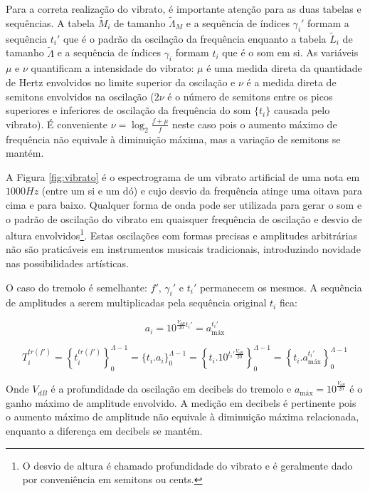 Para a correta realização do vibrato, é importante atenção para as duas tabelas e sequências.
A tabela $\widetilde{M}_i$ de tamanho $\widetilde{\Lambda}_M$ e a sequência de índices $\gamma_i'$ formam a sequência $t_i'$
 que é o padrão da oscilação da frequência enquanto
a tabela $\widetilde{L}_i$ de tamanho $\widetilde{\Lambda}$ e a sequência de índices $\gamma_i$ formam $t_i$ que é o som em si.
As variáveis $\mu$ e $\nu$ quantificam a intensidade do vibrato: $\mu$ é uma medida direta da quantidade
de Hertz envolvidos no limite superior da oscilação e $\nu$ é a medida direta de semitons envolvidos na oscilação ($2\nu$ é o número de semitons entre os picos superiores e inferiores de oscilação da frequência do som $\{t_i\}$ causada pelo vibrato).
É conveniente $\nu=\log_{2}\frac{f+\mu}{f} $ neste caso pois o aumento máximo de frequência
não equivale à diminuição máxima, mas a variação de semitons se mantém.

A Figura \ref{fig:vibrato} é o espectrograma de um vibrato artificial de uma nota em
$1000Hz$ (entre um si e um dó) e cujo desvio da frequência atinge uma oitava
para cima e para baixo. Qualquer forma de onda pode
ser utilizada para gerar o som e o padrão de oscilação do vibrato
em quaisquer frequência de oscilação e desvio de altura envolvidos\footnote{O desvio de altura
é chamado profundidade do vibrato e é geralmente dado por conveniência em semitons ou cents.}. Estas oscilações com formas precisas e amplitudes arbitrárias não são praticáveis em instrumentos musicais tradicionais, introduzindo novidade nas possibilidades artísticas.

O caso do tremolo é semelhante: $f'$, $\gamma_i'$ e $t_i'$ permanecem os mesmos.
A sequência de amplitudes a serem multiplicadas pela sequência original $t_i$ fica:

\begin{equation}\label{trA}
a_i=10^{\frac{V_{dB}}{20}t_i' } = a_{\text{máx}}^{t_i'}
\end{equation}

\begin{equation}\label{trT}
T_i^{tr(f')}=\left \{ t_i^{tr(f')} \right \}_0^{\Lambda-1}=\{ t_i . a_i \}_0^{\Lambda-1}=\left \{t_i .10^{t_i' \frac{V_{dB}}{20}}    \right \}_0^{\Lambda-1}=\left\{t_i . a_{\text{máx}}^{t_i'} \right\}_0^{\Lambda-1}
\end{equation}

Onde $V_{dB}$ é a profundidade da oscilação em decibels do tremolo e $a_{\text{máx}}=10^{\frac{V_{dB}}{20}}$
 é o ganho máximo de amplitude envolvido.
A medição em decibels é pertinente pois o aumento máximo de amplitude
não equivale à diminuição máxima relacionada, enquanto a diferença em decibels se mantém.

